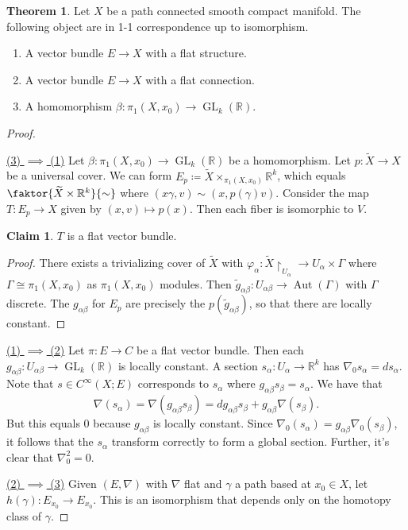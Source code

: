 \documentclass[10pt,letterpaper,cm]{nupset}
\theoremstyle{definition}
\theoremstyle{theorem}
\newtheorem{theorem}[definition]{Theorem}
\newtheorem*{claim}{Claim}
\theoremstyle{remark}
\newcommand{\R}{\mathbb{R}}
\newcommand{\1}{\mathbb{1}}
\newcommand{\0}{\vec 0}
\DeclareMathOperator{\GL}{GL}
\DeclareMathOperator{\aut}{Aut}
\begin{document}
\begin{theorem}
Let $X$ be a path connected smooth compact manifold. The following object are in 1-1 correspondence up to isomorphism.
\begin{enumerate}
\item A vector bundle $E \to X$ with a flat structure.
\item A vector bundle $E \to X$ with a flat connection.
\item A homomorphism $\beta : \pi_1(X, x_0) \to \GL_k(\R)$.
\end{enumerate}
\end{theorem}
\begin{proof} $ $

\underline{(3) $\implies$ (1)} Let $\beta : \pi_1(X, x_0) \to \GL_k(\R)$ be a homomorphism. Let $p : \widetilde{X} \to X$ be a universal cover. We can form $E_p \coloneqq  \widetilde{X} \times_{\pi_1(X, x_0)} \R^k$, which equals $\faktor{\widetilde{X} \times \R^k}{\sim}$ where $(x{\gamma}, v) \sim (x, p(\gamma)v)$.  Consider the map $T: E_p \to X$ given by $(x,v) \mapsto p(x)$. Then each fiber is isomorphic to $V$.
\begin{claim}
$T$ is a flat vector bundle.
\end{claim}
\begin{proof}
There exists a trivializing cover of $\widetilde{X}$ with $\varphi_{\alpha} : \widetilde{X}\restriction_{U_{\alpha}} \to U_{\alpha} \times \Gamma$ where $\Gamma \cong \pi_1(X, x_0)$ as $\pi_1(X, x_0)$ modules. Then $\tilde{g}_{\alpha{\beta}} : U_{\alpha{\beta}} \to \aut(\Gamma)$ with $\Gamma$ discrete. The $g_{\alpha{\beta}}$ for $E_p$ are precisely the $p(\tilde{g}_{\alpha{\beta}})$, so that there are locally constant. 
\end{proof}
\underline{(1) $\implies$ (2)} Let $\pi : E \to C$ be a flat vector bundle. Then each $g_{\alpha{\beta}} : U_{\alpha{\beta}} \to \GL_k(\R)$  is locally constant. A section  $s_{\alpha} : U_{\alpha} \to \R^k$ has $\nabla_0{s_{\alpha}} = ds_{\alpha}$. Note that $s \in C^{\infty}(X; E)$ corresponds to $s_{\alpha}$ where $g_{\alpha{\beta}}s_{\beta} = s_{\alpha}$. We have that $$ \nabla(s_{\alpha}) = \nabla(g_{\alpha{\beta}}s_{\beta}) = dg_{\alpha{\beta}} s_{\beta} + g_{\alpha{\beta}}\nabla(s_{\beta})    .$$ But this equals $0$ because $g_{\alpha{\beta}}$ is locally constant. Since $\nabla_0(s_{\alpha}) = g_{\alpha{\beta}} \nabla_0(s_{\beta})$, it follows that the $s_{\alpha}$  transform correctly to form a global section. Further, it's clear that $\nabla_0^2 =0$. 

\underline{(2) $\implies$ (3)} Given $(E, \nabla)$ with $\nabla$ flat and $\gamma$ a path based at $x_0 \in X$, let $h(\gamma) : E_{x_0} \to E_{x_0}$. This is an isomorphism that depends only on the homotopy class of $\gamma$.
\end{proof}
\end{document}
